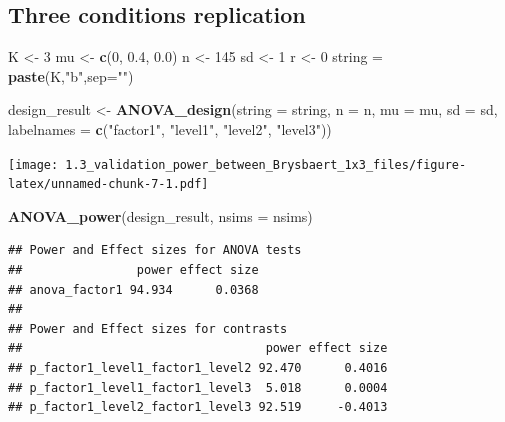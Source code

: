 \documentclass[]{article}
\newenvironment{Shaded}{\begin{snugshade}}{\end{snugshade}}
\newcommand{\KeywordTok}[1]{\textcolor[rgb]{0.13,0.29,0.53}{\textbf{#1}}}
\newcommand{\DataTypeTok}[1]{\textcolor[rgb]{0.13,0.29,0.53}{#1}}
\newcommand{\DecValTok}[1]{\textcolor[rgb]{0.00,0.00,0.81}{#1}}
\newcommand{\FloatTok}[1]{\textcolor[rgb]{0.00,0.00,0.81}{#1}}
\newcommand{\StringTok}[1]{\textcolor[rgb]{0.31,0.60,0.02}{#1}}
\newcommand{\NormalTok}[1]{#1}
\begin{document}
\subsection{Three conditions
replication}\label{three-conditions-replication-1}

\begin{Shaded}
\begin{Highlighting}[]
\NormalTok{K <-}\StringTok{ }\DecValTok{3}
\NormalTok{mu <-}\StringTok{ }\KeywordTok{c}\NormalTok{(}\DecValTok{0}\NormalTok{, }\FloatTok{0.4}\NormalTok{, }\FloatTok{0.0}\NormalTok{)}
\NormalTok{n <-}\StringTok{ }\DecValTok{145}
\NormalTok{sd <-}\StringTok{ }\DecValTok{1}
\NormalTok{r <-}\StringTok{ }\DecValTok{0}
\NormalTok{string =}\StringTok{ }\KeywordTok{paste}\NormalTok{(K,}\StringTok{"b"}\NormalTok{,}\DataTypeTok{sep=}\StringTok{""}\NormalTok{)}
\end{Highlighting}
\end{Shaded}

\begin{Shaded}
\begin{Highlighting}[]
\NormalTok{design_result <-}\StringTok{ }\KeywordTok{ANOVA_design}\NormalTok{(}\DataTypeTok{string =}\NormalTok{ string,}
                   \DataTypeTok{n =}\NormalTok{ n, }
                   \DataTypeTok{mu =}\NormalTok{ mu, }
                   \DataTypeTok{sd =}\NormalTok{ sd, }
                   \DataTypeTok{labelnames =} \KeywordTok{c}\NormalTok{(}\StringTok{"factor1"}\NormalTok{, }\StringTok{"level1"}\NormalTok{, }\StringTok{"level2"}\NormalTok{, }\StringTok{"level3"}\NormalTok{))}
\end{Highlighting}
\end{Shaded}

\texttt{[image: 1.3\_validation\_power\_between\_Brysbaert\_1x3\_files/figure-latex/unnamed-chunk-7-1.pdf]}

\begin{Shaded}
\begin{Highlighting}[]
\KeywordTok{ANOVA_power}\NormalTok{(design_result, }\DataTypeTok{nsims =}\NormalTok{ nsims)}
\end{Highlighting}
\end{Shaded}

\begin{verbatim}
## Power and Effect sizes for ANOVA tests
##                power effect size
## anova_factor1 94.934      0.0368
## 
## Power and Effect sizes for contrasts
##                                  power effect size
## p_factor1_level1_factor1_level2 92.470      0.4016
## p_factor1_level1_factor1_level3  5.018      0.0004
## p_factor1_level2_factor1_level3 92.519     -0.4013
\end{verbatim}
\end{document}
